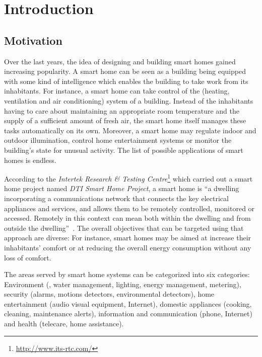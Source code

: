 \chapter{Introduction}
\label{ch:intro}

\section{Motivation}

Over the last years, the idea of designing and building smart homes gained increasing popularity. A smart home can be seen as a building being equipped with some kind of intelligence which enables the building to take work from its inhabitants. For instance, a smart home can take control of the  (heating, ventilation and air conditioning) system of a building. Instead of the inhabitants having to care about maintaining an appropriate room temperature and the supply of a sufficient amount of fresh air, the smart home itself manages these tasks automatically on its own. Moreover, a smart home may regulate indoor and outdoor illumination, control home entertainment systems or monitor the building's state for unusual activity. The list of possible applications of smart homes is endless.

According to the \emph{Intertek Research \& Testing Centre}\footnote{\href{http://www.its-rtc.com/}{http://www.its-rtc.com/}} which carried out a smart home project named \emph{DTI Smart Home Project}, a smart home is ``a dwelling incorporating a communications network that connects the key electrical appliances and services, and allows them to be remotely controlled, monitored or accessed. Remotely in this context can mean both within the dwelling and from outside the dwelling''~\cite{SmartHomeDefinition,SmartHomeResearch}. The overall objectives that can be targeted using that approach are diverse: For instance, smart homes may be aimed at increase their inhabitants' comfort or at reducing the overall energy consumption without any loss of comfort.

The areas served by smart home systems can be categorized into six categories: Environment (, water management, lighting, energy management, metering), security (alarms, motions detectors, environmental detectors), home entertainment (audio visual equipment, Internet), domestic appliances (cooking, cleaning, maintenance alerts), information and communication (phone, Internet) and health (telecare, home assistance). %

